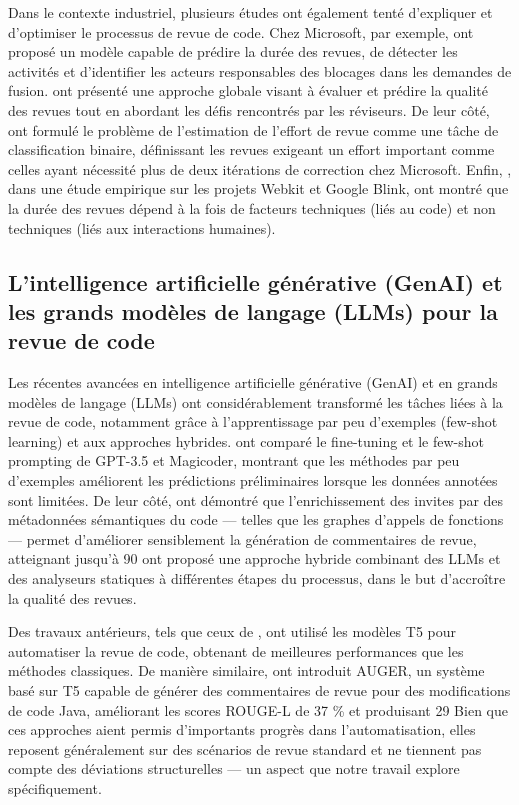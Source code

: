 Dans le contexte industriel, plusieurs études ont également tenté d’expliquer et d’optimiser le processus de revue de code. Chez Microsoft, par exemple, \textcite{maddila2023nudge} ont proposé un modèle capable de prédire la durée des revues, de détecter les activités et d’identifier les acteurs responsables des blocages dans les demandes de fusion. \textcite{hasan2021using} ont présenté une approche globale visant à évaluer et prédire la qualité des revues tout en abordant les défis rencontrés par les réviseurs.
De leur côté, \textcite{wang2019leveraging, wang2021large} ont formulé le problème de l’estimation de l’effort de revue comme une tâche de classification binaire, définissant les revues exigeant un effort important comme celles ayant nécessité plus de deux itérations de correction chez Microsoft. Enfin, \textcite{baysal2016investigating}, dans une étude empirique sur les projets Webkit et Google Blink, ont montré que la durée des revues dépend à la fois de facteurs techniques (liés au code) et non techniques (liés aux interactions humaines).

\subsection{L'intelligence artificielle générative (GenAI) et les grands modèles de langage (LLMs) pour la revue de code}

Les récentes avancées en intelligence artificielle générative (GenAI) et en grands modèles de langage (LLMs) ont considérablement transformé les tâches liées à la revue de code, notamment grâce à l’apprentissage par peu d’exemples (few-shot learning) et aux approches hybrides. \textcite{pornprasit2024fine} ont comparé le fine-tuning et le few-shot prompting de GPT-3.5 et Magicoder, montrant que les méthodes par peu d’exemples améliorent les prédictions préliminaires lorsque les données annotées sont limitées.
De leur côté, \textcite{haider2024prompting} ont démontré que l’enrichissement des invites par des métadonnées sémantiques du code — telles que les graphes d’appels de fonctions — permet d’améliorer sensiblement la génération de commentaires de revue, atteignant jusqu’à 90 %
\textcite{jaoua2025combining} ont proposé une approche hybride combinant des LLMs et des analyseurs statiques à différentes étapes du processus, dans le but d’accroître la qualité des revues.

Des travaux antérieurs, tels que ceux de \textcite{tufano2022using}, ont utilisé les modèles T5 pour automatiser la revue de code, obtenant de meilleures performances que les méthodes classiques. De manière similaire, \textcite{li2022auger} ont introduit AUGER, un système basé sur T5 capable de générer des commentaires de revue pour des modifications de code Java, améliorant les scores ROUGE-L de 37 \% et produisant 29 %
Bien que ces approches aient permis d’importants progrès dans l’automatisation, elles reposent généralement sur des scénarios de revue standard et ne tiennent pas compte des déviations structurelles — un aspect que notre travail explore spécifiquement.

